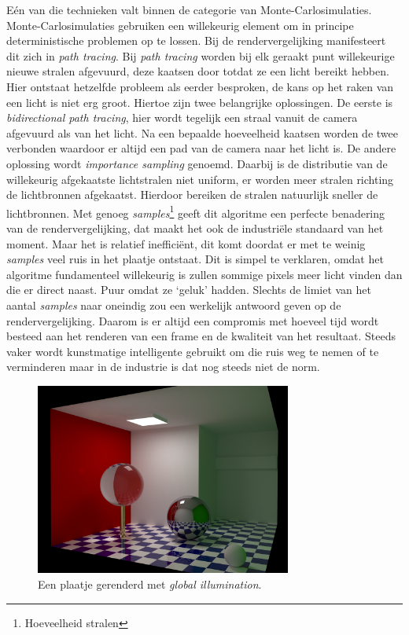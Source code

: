 \documentclass[12pt, a4paper]{article}
\begin{document}
Eén van die technieken valt binnen de categorie van Monte-Carlosimulaties. Monte-Carlosimulaties gebruiken een willekeurig element  om in principe deterministische problemen op te lossen. Bij de rendervergelijking manifesteert dit zich in \emph{path tracing}. Bij \emph{path tracing} worden bij elk geraakt punt willekeurige nieuwe stralen afgevuurd, deze kaatsen door totdat ze een licht bereikt hebben. Hier ontstaat hetzelfde probleem als eerder besproken, de kans op het raken van een licht is niet erg groot. Hiertoe zijn twee belangrijke oplossingen. De eerste is \emph{bidirectional path tracing}, hier wordt tegelijk een straal vanuit de camera afgevuurd als van het licht. Na een bepaalde hoeveelheid kaatsen worden de twee verbonden waardoor er altijd een pad van de camera naar het licht is. De andere oplossing wordt \emph{importance sampling} genoemd. Daarbij is de distributie van de willekeurig afgekaatste lichtstralen niet uniform, er worden meer stralen richting de lichtbronnen afgekaatst. Hierdoor bereiken de stralen natuurlijk sneller de lichtbronnen. Met genoeg \emph{samples}\footnote{Hoeveelheid stralen} geeft dit algoritme een perfecte benadering van de rendervergelijking, dat maakt het ook de industriële standaard van het moment. Maar het is relatief inefficiënt, dit komt doordat er met te weinig \emph{samples} veel ruis in het plaatje ontstaat. Dit is simpel te verklaren, omdat het algoritme fundamenteel willekeurig is zullen sommige pixels meer licht vinden dan die er direct naast. Puur omdat ze ‘geluk’ hadden. Slechts de limiet van het aantal \emph{samples} naar oneindig zou een werkelijk antwoord geven op de rendervergelijking. Daarom is er altijd een compromis met hoeveel tijd wordt besteed aan het renderen van een frame en de kwaliteit van het resultaat. Steeds vaker wordt kunstmatige intelligente gebruikt om die ruis weg te nemen of te verminderen \cite{MonteCarloDenoiser} maar in de industrie is dat nog steeds niet de norm. 

\begin{figure}[H]
	\centering
	\includegraphics[width=0.75\textwidth]{global_illumination.png}
	\caption{Een plaatje gerenderd met \emph{global illumination}.}
	\label{fig:global_illumination}
\end{figure}
\end{document}
